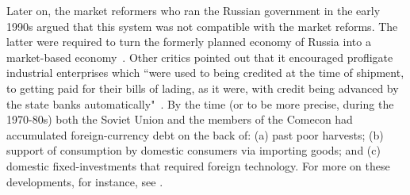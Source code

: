 Later on, the market reformers who ran the Russian government in the early 1990s argued that this system was not compatible with the market reforms. The latter were required to turn the formerly planned economy of Russia into a market-based economy~\citep[p.~56]{gaidar2011}. Other critics pointed out that it encouraged profligate industrial enterprises which ``were used to being credited at the time of shipment, to getting paid for their bills of lading, as it were, with credit being advanced by the state banks automatically"~\citep[p.~30]{viksnins1997}. By the time (or to be more precise, during the 1970-80s) both the Soviet Union and the members of the Comecon had accumulated foreign-currency debt on the back of: (a) past poor harvests; (b) support of consumption by domestic consumers via importing goods; and (c) domestic fixed-investments that required foreign technology. For more on these developments, for instance, see \citep{coombs1976,poznanski1996,kotkin2001,gaidar2002,harold2003}. 

